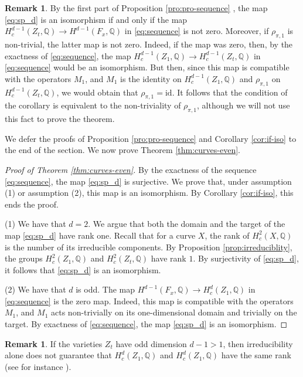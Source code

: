 \documentclass[11pt, reqno]{amsart}
\theoremstyle{plain}
\theoremstyle{definition}
\newtheorem{rem}[thm]{Remark}
\newcommand{\QQ}{\mathbb{Q}}
\begin{document}
\begin{rem}
\label{eq:can}
By the first part of Proposition \ref{pro:pro-sequence} , the map \eqref{eq:sp_d} is an isomorphism if and only if the map 
$H^{d-1}_c(Z_t,  \QQ) \to H^{d-1}(F_x, \QQ)$ in \eqref{eq:sequence} is not zero. 
Moreover, 
if $\rho_{\pi,1}$ is non-trivial, the latter map is not zero. Indeed, if the map was zero, then, by the exactness of \eqref{eq:sequence}, the map $H^{d-1}_c(Z_1,\QQ) \to H^{d-1}_c(Z_t,\QQ)$ in \eqref{eq:sequence} would be an isomorphism. But then, since this map is compatible with the operators $M_1$, and $M_1$ is the identity on $H^{d-1}_c(Z_1,\QQ)$ and $\rho_{\pi,1}$ on $H^{d-1}_c(Z_t,  \QQ)$, we would obtain that $\rho_{\pi,1}=\mathrm{id}$.    
It follows that the condition of the corollary is equivalent to the non-triviality of $\rho_{\pi,1}$, although we will not use this fact to prove the theorem. 
 \end{rem}
\smallskip

We defer the proofs of Proposition \ref{pro:pro-sequence} and Corollary
\ref{cor:if-iso} to the end of the section. We now prove Theorem \ref{thm:curves-even}. 

\begin{proof}[Proof of Theorem \ref{thm:curves-even}]
By the exactness of the sequence \eqref{eq:sequence}, the map \eqref{eq:sp_d} is surjective. 
We prove that, under assumption (1) or assumption (2), this map is an isomorphism. By Corollary \ref{cor:if-iso}, this ends the proof. 


(1) We have that $d=2$. 
We argue that both the domain and the target of the map \eqref{eq:sp_d} have rank one.
Recall that for a curve $X$, the rank of $H^2_c(X, \QQ)$ is the number of its irreducible components.
By Proposition \ref{prop:irreduciblity}, the groups $H^{2}_c(Z_1,\mathbb{Q})$ and $H^{2}_c(Z_t,\mathbb{Q})$  have rank $1$. By surjectivity of \eqref{eq:sp_d}, it follows that \eqref{eq:sp_d} is an isomorphism.


(2) %
We have that $d$ is odd. The map $H^{d-1}(F_x, \QQ) \to H^d_c(Z_1,\QQ)$ in \eqref{eq:sequence} is the zero map.  
Indeed, this map is compatible with the operators $M_1$, and $M_1$ acts non-trivially on its one-dimensional domain and trivially on the target.
By exactness of \eqref{eq:sequence}, the map \eqref{eq:sp_d} is an isomorphism.
\end{proof}


\begin{rem}\label{rem:irreducibility-is-not-enough}
If the varieties $Z_t$ have odd dimension $d-1>1$, then irreducibility alone does not  guarantee that $H^d_c(Z_1, \QQ)$ and $H^d_c(Z_1, \QQ)$ have the same rank (see for instance \cite{Lin20}). 
\end{rem}
\smallskip
\end{document}
